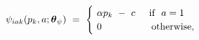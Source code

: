 \begin{equation}
\begin{split}
    \psi_{iak}(p_{k}, a; \boldsymbol{\theta}_{\psi}) \
    & = \ 
    \begin{cases}
        \ \alpha p_{k} \ - \ c \hspace{0.5cm} \text{if \ $a = 1$} \\
        \ 0 \hspace{1.8cm} \text{otherwise},
    \end{cases}
\end{split}
\label{Equation:Firms-Problem_Instantaneous-Payoff}
\end{equation}